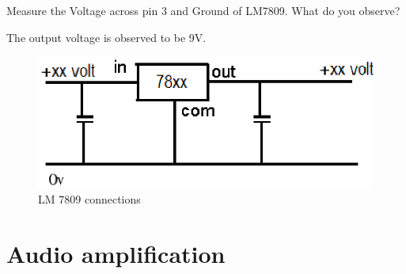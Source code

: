 \documentclass[journal,12pt,twocolumn]{IEEEtran}
\begin{document}
\begin{problem}
Measure the Voltage across pin 3 and Ground of LM7809. What do you observe?
\end{problem}
\solution
The output voltage is observed to be 9V.
\begin{figure}[!ht]
\centering
	\includegraphics[width=\columnwidth]{./figs/lm7809.eps}
	\caption{LM 7809 connections}  \label{lm7809}
    \end{figure}

\section{Audio amplification}
\end{document}
